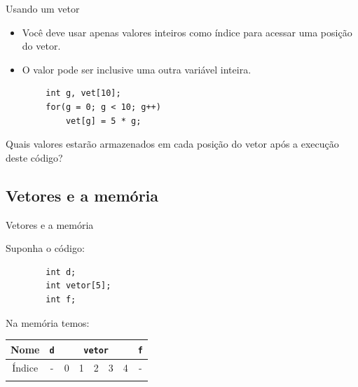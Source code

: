 \documentclass[handout]{beamer}
\newcommand{\cod}[1]{\texttt{#1}}
\begin{document}
\begin{frame}[fragile]{Usando um vetor}

    \begin{itemize}
        \item Você deve usar apenas valores inteiros como índice para acessar uma posição do vetor.
        \item O valor pode ser inclusive uma outra variável inteira. 
    \end{itemize}

    \begin{verbatim}
        int g, vet[10];
        for(g = 0; g < 10; g++)
            vet[g] = 5 * g;
    \end{verbatim}

    Quais valores estarão armazenados em cada posição do vetor após a execução deste código?

\end{frame}


\subsection{Vetores e a memória}

\begin{frame}[fragile]{Vetores e a memória}

    Suponha o código:
    \begin{verbatim}
        int d;
        int vetor[5];
        int f;
    \end{verbatim}

    Na memória temos:
    \begin{center}
        \begin{tabular}{|c|c|c|c|c|c|c|c|}
          \hline
          Nome & \cod{d} & \multicolumn{5}{|c|}{\cod{vetor}} & \cod{f} \\
          \hline
          Índice & - & 0 & 1 & 2 & 3 & 4 & - \\
          \hline
               & & & & & & & \\
          \hline
        \end{tabular}
    \end{center}

\end{frame}
\end{document}
